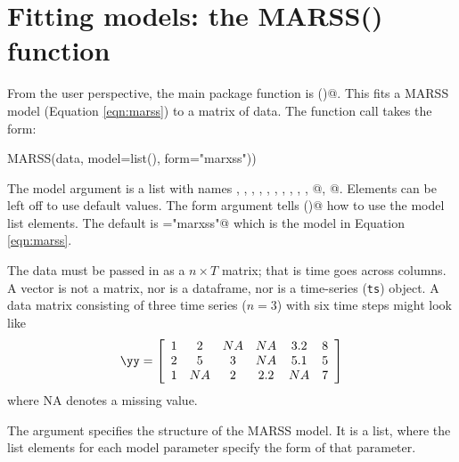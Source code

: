 \chapter{Fitting models: the MARSS() function}\label{chap:MARSS}

From the user perspective, the main package function is \verb@MARSS()@.  This fits a MARSS model (Equation \ref{eqn:marss}) to a matrix of data. The function call takes the form:
\begin{Schunk}
\begin{Sinput}
MARSS(data, model=list(), form="marxss")) 
\end{Sinput}
\end{Schunk}
The model argument is a list with names \verb@B@, \verb@U@, \verb@C@, \verb@c@, \verb@Q@, \verb@Z@, \verb@A@, \verb@D@, \verb@d@, \verb@R@, @, @.  Elements can be left off to use default values.  The form argument tells \verb@MARSS()@ how to use the model list elements.  The default is \verb@form="marxss"@ which is the model in Equation \ref{eqn:marss}.

The data must be passed in as a $n \times T$ matrix; that is time goes across columns.  A vector is not a matrix, nor is a dataframe, nor is a time-series (\texttt{ts}) object. A data matrix consisting of three time series ($n=3$) with six time steps might look like
\begin{equation*}
\yy = \left[ \begin{array}{ccccccc}
    1 & 2 & NA & NA & 3.2 & 8\\
    2 & 5 &  3 & NA & 5.1 & 5\\
    1 & NA & 2 & 2.2 & NA & 7\end{array} \right]
\end{equation*}
where NA denotes a missing value.

The argument \verb@model@ specifies the structure of the MARSS model.  It is a list, where the list elements for each model parameter specify the form of that parameter.  

